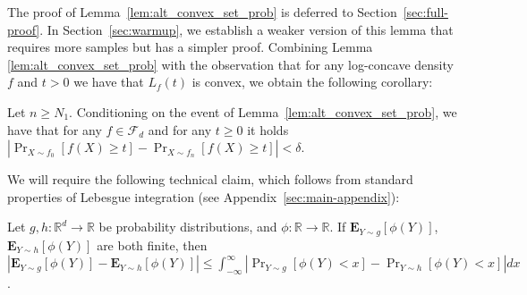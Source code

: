 \documentclass[final,12pt]{colt2018}
\newcommand{\nnew}[1]{{\color{red} #1}}
\newcommand{\nnew}[1]{#1}
\newcommand{\new}[1]{{\color{red} #1}}
\newcommand{\new}[1]{{#1}}
\newtheorem{informal theorem}[theorem]{Theorem (informal statement)}
\newcommand{\E}{\mathbf{E}}
\begin{document}
The proof of Lemma~\ref{lem:alt_convex_set_prob} is deferred to Section~\ref{sec:full-proof}. 
In Section~\ref{sec:warmup}, we establish a weaker version of this lemma 
that requires more samples but has a simpler proof.
Combining Lemma \ref{lem:alt_convex_set_prob} with the observation 
that for any log-concave density $f$ and $t > 0$ we have that $L_f(t)$ is convex, 
we obtain the following corollary:

\begin{corollary}\label{cor:imp_convex_set_prob}
Let $n \geq N_1$.
\new{Conditioning on the event of Lemma~\ref{lem:alt_convex_set_prob},}
we have that for any $f \in \mathcal{F}_d$ and for any $t \geq 0$ 
it holds
$
\left|{\Pr}_{X\sim f_0}[f(X) \geq t] - {\Pr}_{X\sim f_n}[f(X) \geq t]\right| < \delta.$
\end{corollary}

\new{
We will require the following technical claim, which follows from standard properties
of Lebesgue integration (see Appendix~\ref{sec:main-appendix}):}
\begin{lemma}\label{lem:aux_exp}
Let $g,h:\mathbb{R}^d\to \mathbb{R}$ be \nnew{probability distributions}, and $\phi:\mathbb{R}\to \mathbb{R}$.
If ${\E}_{Y\sim g}[\phi(Y)]$, ${\E}_{Y\sim h}[\phi(Y)]$ are both finite, then
$
|{\E}_{Y\sim g}[\phi(Y)] - {\E}_{Y\sim h}[\phi(Y)]| \leq \int^{\infty}_{-\infty} | {\Pr}_{Y\sim g}[\phi(Y) < x] - {\Pr}_{Y\sim h}[\phi(Y) < x] | dx
$.
\end{lemma}
\end{document}
